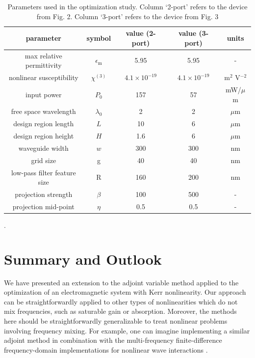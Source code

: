 \begin{center}
\begin{table}[h]
\begin{tabular}{ |c|c|c|c|c| } 
 \hline
  parameter & symbol & value (2-port) & value (3-port) & units \\ 
  \hline
  \hline
 max relative permittivity & $\epsilon_\textrm{m}$ & 5.95 & 5.95 & - \\ 
 nonlinear susceptibility &  $\chi^{(3)}$ & $4.1\times 10^{-19}$ & $4.1\times 10^{-19}$ & m$^2$ V$^{-2}$ \\ 
 input power & $P_0$ & 157 & 57 & mW/$\mu$m \\
 free space wavelength & $\lambda_0$ & 2 & 2 & $\mu$m \\ 
 design region length & $L$ & 10 & 6 & $\mu \textrm{m}$ \\ 
 design region height & $H$ & 1.6 & 6 & $\mu \textrm{m}$ \\ 
 waveguide width & $w$ & 300 & 300 & $ \textrm{nm}$ \\ 
 grid size & g & 40 & 40 & nm \\
 low-pass filter feature size & R & 160 & 200 & nm \\
 projection strength & $\beta$ & 100 & 500 & - \\
 projection mid-point & $\eta$ & 0.5 & 0.5 & - \\
 \hline
\end{tabular}
\caption{\label{table:params} Parameters used in the optimization study.  Column `2-port' refers to the device from Fig. 2. Column `3-port' refers to the device from Fig. 3}.
\label{tb:params}
\end{table}
\end{center}

\section{Summary and Outlook}

We have presented an extension to the adjoint variable method applied to the optimization of an electromagnetic system with Kerr nonlinearity. Our approach can be straightforwardly applied to other types of nonlinearities which do not mix frequencies, such as saturable gain or absorption. Moreover, the methods here should be straightforwardly generalizable to treat nonlinear problems involving frequency mixing. For example, one can imagine implementing a similar adjoint method in combination with the multi-frequency finite-difference frequency-domain implementations for nonlinear wave interactions \cite{Shi2016multi}. 

